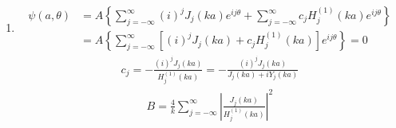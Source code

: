 \begin{enumerate}
          \begin{align*}
              B & =\frac{2}{k\pi}
              \int_{0}^{2\pi}
              \left|
              \sum_{j=-\infty}^{\infty}c_j
              (-i)^j
              e^{ij\theta}
              \right|^2 d\theta
              \\
                & =
              \frac{2}{k\pi}
              \int_{0}^{2\pi}
              \sum_{j=-\infty}^{\infty}
              \sum_{s=-\infty}^{\infty}c_j
              (-i)^j
              e^{ij\theta}
              c_s^*
              (i)^s
              e^{-is\theta} d\theta
              \\
                & =
              \frac{2}{k\pi}2\pi
              \sum_{j=-\infty}^{\infty}
              c_j
              (-i)^j
              c_j^*
              (i)^j
              \\
                & =
              \frac{4}{k}
              \sum_{j=-\infty}^{\infty}
              |c_j|^2.
          \end{align*}
    \item
          \begin{align*}
              \psi(a,\theta) & =
              A\left\{
              \sum_{j=-\infty}^{\infty}
              (i)^j J_j(ka)e^{ij\theta} + \sum_{j=-\infty}^{\infty}
              c_j     H_j^{(1)} (ka)e^{ij\theta}
              \right \} \\
                             & =
              A\left\{
              \sum_{j=-\infty}^{\infty}
              \left[(i)^j J_j(ka) +
                  c_j     H_j^{(1)} (ka)\right]e^{ij\theta}
              \right \} = 0
          \end{align*}
          \begin{align*}
              c_j = -\frac{(i)^j J_j(ka)}{H_j^{(1)}(ka)} =
              -\frac{(i)^j J_j(ka)}{J_j(ka) + iY_j(ka)}
          \end{align*}
          \begin{align*}
              B = \frac{4}{k}
              \sum_{j=-\infty}^{\infty}
              \left|\frac{J_j(ka)}{H_j^{(1)}(ka)}\right|^2
          \end{align*}
\end{enumerate}


